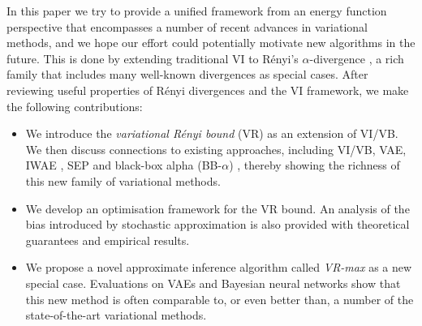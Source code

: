 In this paper we try to provide a unified framework from an energy function perspective that encompasses a number of recent advances in variational methods, and we hope our effort could potentially motivate new algorithms in the future. This is done by extending traditional VI to R{\'e}nyi's $\alpha$-divergence \cite{renyi:divergence}, a rich family that includes many well-known divergences as special cases. After reviewing useful properties of R{\'e}nyi divergences and the VI framework, we make the following contributions:

\begin{itemize}[leftmargin=8mm]
 \item We introduce the \emph{variational R{\'e}nyi bound} (VR) as an extension of VI/VB. We then discuss connections to existing approaches, including VI/VB, VAE, IWAE \cite{burda:iwae}, SEP \cite{li:sep} and black-box alpha (BB-$\alpha$) \cite{hernandez-lobato:bb-alpha}, thereby showing the richness of this new family of variational methods.
 \item We develop an optimisation framework for the VR bound. An analysis of the bias introduced by stochastic approximation is also provided with theoretical guarantees and empirical results.
 \item We propose a novel approximate inference algorithm called \emph{VR-max} as a new special case. Evaluations on VAEs and Bayesian neural networks show that this new method is often comparable to, or even better than, a number of the state-of-the-art variational methods.
\end{itemize}